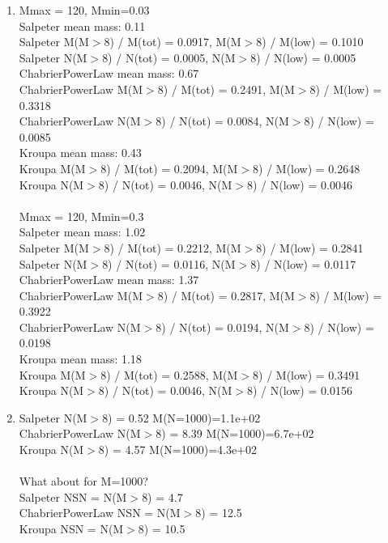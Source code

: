 \documentclass{article}
\begin{document}
\begin{enumerate}
\begin{enumerate}
\item %
    Mmax = 120, Mmin=0.03 \\
Salpeter mean mass: 0.11 \\
Salpeter M(M$>$8) / M(tot) = 0.0917, M(M$>$8) / M(low) = 0.1010 \\
Salpeter N(M$>$8) / N(tot) = 0.0005, N(M$>$8) / N(low) = 0.0005 \\
ChabrierPowerLaw mean mass: 0.67 \\
ChabrierPowerLaw M(M$>$8) / M(tot) = 0.2491, M(M$>$8) / M(low) = 0.3318 \\
ChabrierPowerLaw N(M$>$8) / N(tot) = 0.0084, N(M$>$8) / N(low) = 0.0085 \\
Kroupa mean mass: 0.43 \\
Kroupa M(M$>$8) / M(tot) = 0.2094, M(M$>$8) / M(low) = 0.2648 \\
Kroupa N(M$>$8) / N(tot) = 0.0046, N(M$>$8) / N(low) = 0.0046 \\
 \\
Mmax = 120, Mmin=0.3 \\
Salpeter mean mass: 1.02 \\
Salpeter M(M$>$8) / M(tot) = 0.2212, M(M$>$8) / M(low) = 0.2841 \\
Salpeter N(M$>$8) / N(tot) = 0.0116, N(M$>$8) / N(low) = 0.0117 \\
ChabrierPowerLaw mean mass: 1.37 \\
ChabrierPowerLaw M(M$>$8) / M(tot) = 0.2817, M(M$>$8) / M(low) = 0.3922 \\
ChabrierPowerLaw N(M$>$8) / N(tot) = 0.0194, N(M$>$8) / N(low) = 0.0198 \\
Kroupa mean mass: 1.18 \\
Kroupa M(M$>$8) / M(tot) = 0.2588, M(M$>$8) / M(low) = 0.3491 \\
Kroupa N(M$>$8) / N(tot) = 0.0046, N(M$>$8) / N(low) = 0.0156

\item %
Salpeter          N(M$>$8) = 0.52  M(N=1000)=1.1e+02\\
ChabrierPowerLaw  N(M$>$8) = 8.39  M(N=1000)=6.7e+02\\
Kroupa            N(M$>$8) = 4.57  M(N=1000)=4.3e+02\\
\\
What about for M=1000? \\
Salpeter          NSN = N(M$>$8) = 4.7\\
ChabrierPowerLaw  NSN = N(M$>$8) = 12.5\\
Kroupa            NSN = N(M$>$8) = 10.5



\end{enumerate}
\end{enumerate}
\end{document}
